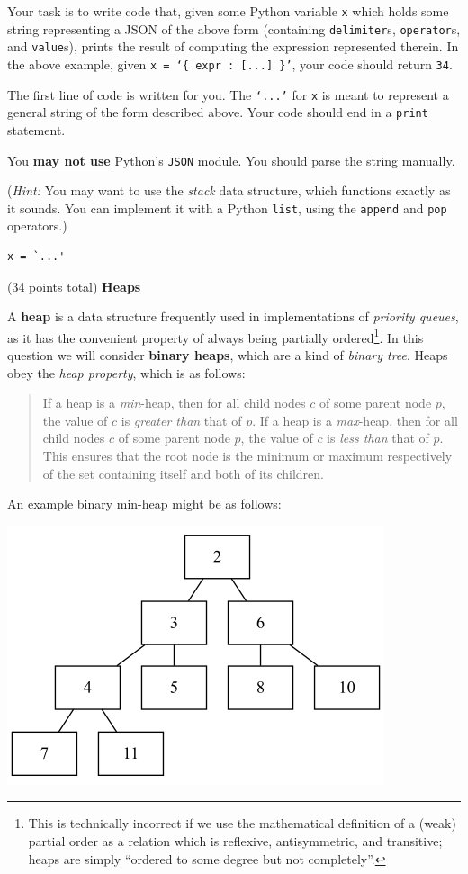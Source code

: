 \documentclass[addpoints]{exam}
\def\c#1{\texttt{#1}}
\begin{document}
\begin{questions}
Your task is to write code that, given some Python variable \texttt{x} which holds some string representing a JSON of the above form (containing \texttt{delimiter}s, \texttt{operator}s, and \texttt{value}s), prints the result of computing the expression represented therein. In the above example, given \texttt{x = `\{ expr : [...] \}'}, your code should return \texttt{34}.

The first line of code is written for you. The \texttt{`...'} for \texttt{x} is meant to represent a general string of the form described above. Your code should end in a \texttt{print} statement.

You \underline{\textbf{may not use}} Python's \c{JSON} module. You should parse the string manually.

(\emph{Hint:} You may want to use the \emph{stack} data structure, which functions exactly as it sounds. You can implement it with a Python \texttt{list}, using the \texttt{append} and \texttt{pop} operators.)

\begin{verbatim}
x = `...'
\end{verbatim}

\newpage

\question (34 points total) \textbf{Heaps} 

A \textbf{heap} is a data structure frequently used in implementations of \emph{priority queues}, as it has the convenient property of always being partially ordered\footnote{This is technically incorrect if we use the mathematical definition of a (weak) partial order as a relation which is reflexive, antisymmetric, and transitive; heaps are simply ``ordered to some degree but not completely''.}. In this question we will consider \textbf{binary heaps}, which are a kind of \emph{binary tree}. Heaps obey the \emph{heap property}, which is as follows:

\begin{quote}
    If a heap is a \emph{min}-heap, then for all child nodes $c$ of some parent node $p$, the value of $c$ is \emph{greater than} that of $p$. If a heap is a \emph{max}-heap, then for all child nodes $c$ of some parent node $p$, the value of $c$ is \emph{less than} that of $p$. This ensures that the root node is the minimum or maximum respectively of the set containing itself and both of its children.
\end{quote}

An example binary min-heap might be as follows:

\begin{center}
\includegraphics[width=0.6\columnwidth]{"heap-graph.png"}
\end{center}


\end{questions}
\end{document}
